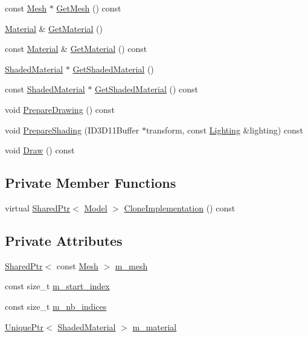 \begin{DoxyCompactItemize}
const \hyperlink{classmage_1_1_mesh}{Mesh} $\ast$ \hyperlink{classmage_1_1_model_a085c12b33ebe60e7576c643e2d47baf0}{Get\+Mesh} () const
\item 
\hyperlink{structmage_1_1_material}{Material} \& \hyperlink{classmage_1_1_model_ae2d9b0fee188fe8f0377872bc2f8c2f6}{Get\+Material} ()
\item 
const \hyperlink{structmage_1_1_material}{Material} \& \hyperlink{classmage_1_1_model_aedb16dfea55edaefc3e5d88e9f9fa756}{Get\+Material} () const
\item 
\hyperlink{structmage_1_1_shaded_material}{Shaded\+Material} $\ast$ \hyperlink{classmage_1_1_model_af709f5b1ec136cbab25bda39e20e1662}{Get\+Shaded\+Material} ()
\item 
const \hyperlink{structmage_1_1_shaded_material}{Shaded\+Material} $\ast$ \hyperlink{classmage_1_1_model_a84af7ad13b2bc1d8a51828a62fbaa4b0}{Get\+Shaded\+Material} () const
\item 
void \hyperlink{classmage_1_1_model_a0083c64e8199db23b78a9281be84685f}{Prepare\+Drawing} () const
\item 
void \hyperlink{classmage_1_1_model_a14cc836651dc3eeb378d749b24c149d9}{Prepare\+Shading} (I\+D3\+D11\+Buffer $\ast$transform, const \hyperlink{structmage_1_1_lighting}{Lighting} \&lighting) const
\item 
void \hyperlink{classmage_1_1_model_a13badcd5e7bfaf8fbdc447dc211d5ad9}{Draw} () const
\end{DoxyCompactItemize}
\subsection*{Private Member Functions}
\begin{DoxyCompactItemize}
\item 
virtual \hyperlink{namespacemage_a1e01ae66713838a7a67d30e44c67703e}{Shared\+Ptr}$<$ \hyperlink{classmage_1_1_model}{Model} $>$ \hyperlink{classmage_1_1_model_af90feb622e30e1531983c01372b2df37}{Clone\+Implementation} () const
\end{DoxyCompactItemize}
\subsection*{Private Attributes}
\begin{DoxyCompactItemize}
\item 
\hyperlink{namespacemage_a1e01ae66713838a7a67d30e44c67703e}{Shared\+Ptr}$<$ const \hyperlink{classmage_1_1_mesh}{Mesh} $>$ \hyperlink{classmage_1_1_model_aecd2b4031c5df30fb5f7ed6d62810f73}{m\+\_\+mesh}
\item 
const size\+\_\+t \hyperlink{classmage_1_1_model_a63a3e697c9eb1606249de15cc7b818c3}{m\+\_\+start\+\_\+index}
\item 
const size\+\_\+t \hyperlink{classmage_1_1_model_a1fcf80ed9f3002bd2319ef83f073ae75}{m\+\_\+nb\+\_\+indices}
\item 
\hyperlink{namespacemage_a8c307fbcc33bce9b7f2aa4c26c3b95cf}{Unique\+Ptr}$<$ \hyperlink{structmage_1_1_shaded_material}{Shaded\+Material} $>$ \hyperlink{classmage_1_1_model_a93e080e5dc2c7c0672a278de76899122}{m\+\_\+material}
\end{DoxyCompactItemize}


